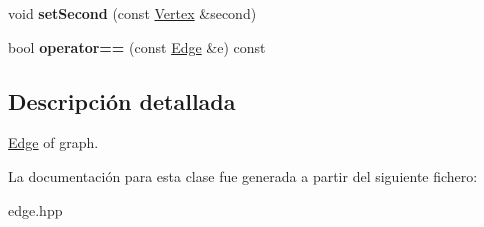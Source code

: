 \begin{DoxyCompactItemize}
\item 
\hypertarget{classedi_1_1Edge_a23168fba337f88426b776b9b00e21ce4}{}void {\bfseries set\+Second} (const \hyperlink{classedi_1_1Vertex}{Vertex} \&second)\label{classedi_1_1Edge_a23168fba337f88426b776b9b00e21ce4}

\item 
\hypertarget{classedi_1_1Edge_ab1bbb20a4ea2c016acd11a40376a3ffe}{}bool {\bfseries operator==} (const \hyperlink{classedi_1_1Edge}{Edge} \&e) const \label{classedi_1_1Edge_ab1bbb20a4ea2c016acd11a40376a3ffe}

\end{DoxyCompactItemize}


\subsection{Descripción detallada}
\hyperlink{classedi_1_1Edge}{Edge} of graph. 

La documentación para esta clase fue generada a partir del siguiente fichero\+:\begin{DoxyCompactItemize}
\item 
edge.\+hpp\end{DoxyCompactItemize}
